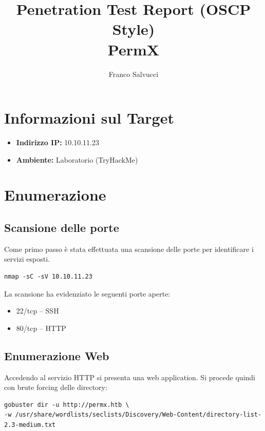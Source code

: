\documentclass[a4paper,11pt]{article}
\title{\textbf{Penetration Test Report (OSCP Style)}\\PermX}
\author{Franco Salvucci}
\date{}
\begin{document}
\maketitle
\tableofcontents
\newpage

\section{Informazioni sul Target}

\begin{itemize}
    \item \textbf{Indirizzo IP:} 10.10.11.23
    \item \textbf{Ambiente:} Laboratorio (TryHackMe)
\end{itemize}

\section{Enumerazione}

\subsection{Scansione delle porte}

Come primo passo è stata effettuata una scansione delle porte per identificare i servizi esposti.

\begin{lstlisting}
nmap -sC -sV 10.10.11.23
\end{lstlisting}

La scansione ha evidenziato le seguenti porte aperte:

\begin{itemize}
    \item 22/tcp – SSH
    \item 80/tcp – HTTP
\end{itemize}

\subsection{Enumerazione Web}

Accedendo al servizio HTTP si presenta una web application.  
Si procede quindi con brute forcing delle directory:

\begin{lstlisting}
gobuster dir -u http://permx.htb \
-w /usr/share/wordlists/seclists/Discovery/Web-Content/directory-list-2.3-medium.txt
\end{lstlisting}
\end{document}
